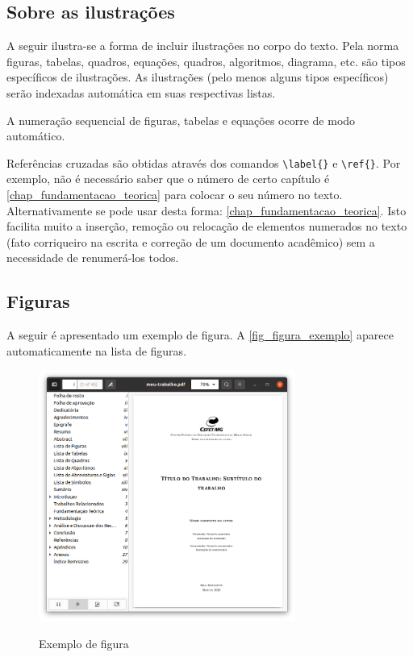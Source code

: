 \begin{apendicesenv}

    \chapter{Sobre as ilustrações}
    \label{chap_sobre_as_ilustracoes}

    A seguir ilustra-se a forma de incluir ilustrações no corpo do texto.
    Pela norma figuras, tabelas, quadros, equações, quadros, algoritmos, diagrama, etc.
    são tipos específicos de ilustrações.
    As ilustrações (pelo menos alguns tipos específicos) serão indexadas automática em suas respectivas listas.

    A numeração sequencial de figuras, tabelas e equações ocorre de modo automático.

    Referências cruzadas são obtidas através dos comandos \verb|\label{}| e \verb|\ref{}|.
    Por exemplo, não é necessário saber que o número de certo capítulo é \ref{chap_fundamentacao_teorica} para colocar o seu número no texto.
    Alternativamente se pode usar desta forma: \autoref{chap_fundamentacao_teorica}.
    Isto facilita muito a inserção, remoção ou relocação de elementos numerados no texto (fato corriqueiro na escrita e correção de um documento acadêmico) sem a necessidade de renumerá-los todos.

    \section{Figuras}
    \label{sec_figuras}

    A seguir é apresentado um exemplo de figura.
    A \autoref{fig_figura_exemplo} aparece automaticamente na lista de figuras.

    \begin{figure}[!htb]
        \centering
        \caption{Exemplo de figura}
        \includegraphics[width=0.75\textwidth]{./figuras/figura-exemplo}
        \label{fig_figura_exemplo}
    \end{figure}


\end{apendicesenv}
